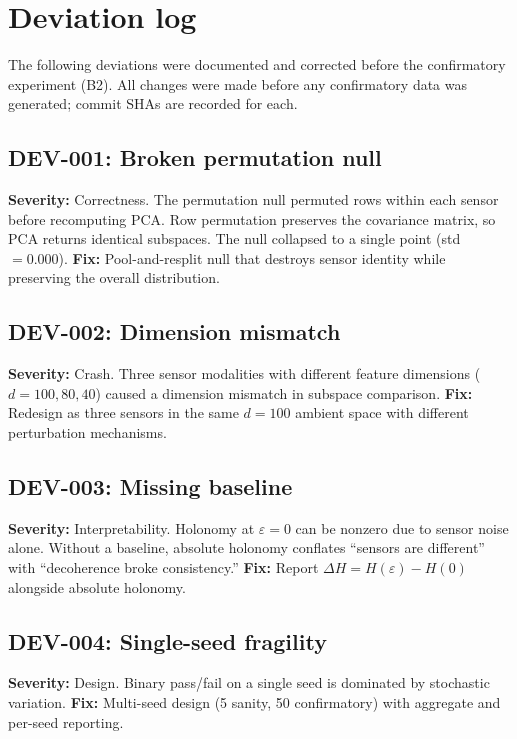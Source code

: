 \documentclass[11pt]{article}
\newcommand{\eps}{\varepsilon}
\begin{document}
\appendix

\section{Deviation log}
\label{app:deviations}

The following deviations were documented and corrected before the
confirmatory experiment (B2).  All changes were made before any
confirmatory data was generated; commit SHAs are recorded for each.

\subsection*{DEV-001: Broken permutation null}
\textbf{Severity:} Correctness.
The permutation null permuted rows within each sensor before
recomputing PCA.  Row permutation preserves the covariance matrix,
so PCA returns identical subspaces.  The null collapsed to a single
point (std $= 0.000$).
\textbf{Fix:} Pool-and-resplit null that destroys sensor identity
while preserving the overall distribution.

\subsection*{DEV-002: Dimension mismatch}
\textbf{Severity:} Crash.
Three sensor modalities with different feature dimensions ($d =
100, 80, 40$) caused a dimension mismatch in subspace comparison.
\textbf{Fix:} Redesign as three sensors in the same $d = 100$
ambient space with different perturbation mechanisms.

\subsection*{DEV-003: Missing baseline}
\textbf{Severity:} Interpretability.
Holonomy at $\eps = 0$ can be nonzero due to sensor noise alone.
Without a baseline, absolute holonomy conflates ``sensors are
different'' with ``decoherence broke consistency.''
\textbf{Fix:} Report $\Delta H = H(\eps) - H(0)$ alongside
absolute holonomy.

\subsection*{DEV-004: Single-seed fragility}
\textbf{Severity:} Design.
Binary pass/fail on a single seed is dominated by stochastic
variation.
\textbf{Fix:} Multi-seed design (5 sanity, 50 confirmatory) with
aggregate and per-seed reporting.
\end{document}
